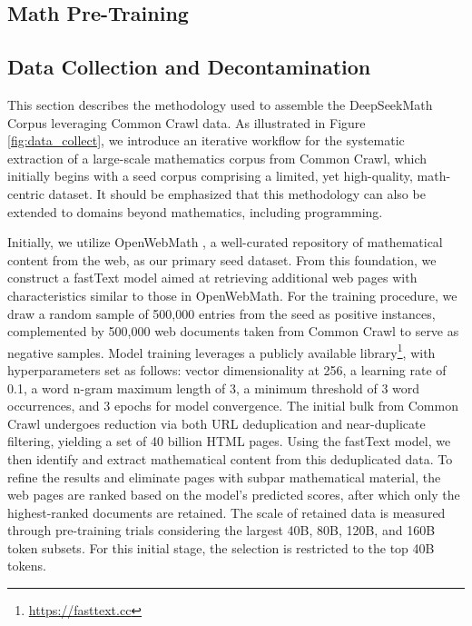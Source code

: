 \begin{itemize}[topsep=0pt]
\section{Math Pre-Training}

\subsection{Data Collection and Decontamination} This section describes the methodology used to assemble the DeepSeekMath Corpus leveraging Common Crawl data. As illustrated in Figure \ref{fig:data_collect}, we introduce an iterative workflow for the systematic extraction of a large-scale mathematics corpus from Common Crawl, which initially begins with a seed corpus comprising a limited, yet high-quality, math-centric dataset. It should be emphasized that this methodology can also be extended to domains beyond mathematics, including programming.

Initially, we utilize OpenWebMath \citep{openwebmath}, a well-curated repository of mathematical content from the web, as our primary seed dataset. From this foundation, we construct a fastText model \citep{joulin2016fasttext} aimed at retrieving additional web pages with characteristics similar to those in OpenWebMath. For the training procedure, we draw a random sample of 500,000 entries from the seed as positive instances, complemented by 500,000 web documents taken from Common Crawl to serve as negative samples. Model training leverages a publicly available library\footnote{\url{https://fasttext.cc}}, with hyperparameters set as follows: vector dimensionality at 256, a learning rate of 0.1, a word n-gram maximum length of 3, a minimum threshold of 3 word occurrences, and 3 epochs for model convergence. The initial bulk from Common Crawl undergoes reduction via both URL deduplication and near-duplicate filtering, yielding a set of 40 billion HTML pages. Using the fastText model, we then identify and extract mathematical content from this deduplicated data. To refine the results and eliminate pages with subpar mathematical material, the web pages are ranked based on the model's predicted scores, after which only the highest-ranked documents are retained. The scale of retained data is measured through pre-training trials considering the largest 40B, 80B, 120B, and 160B token subsets. For this initial stage, the selection is restricted to the top 40B tokens.


\end{itemize}
